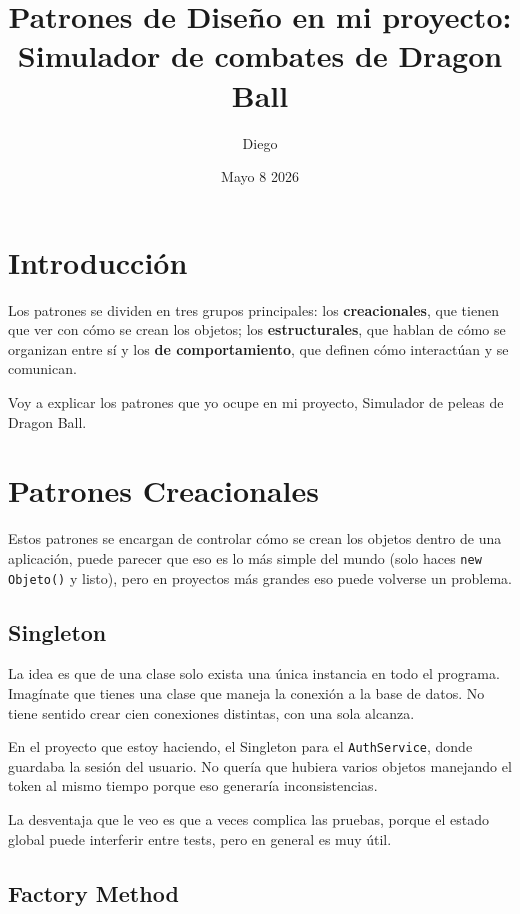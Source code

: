 \documentclass{article}
\title{Patrones de Dise\~no en mi proyecto: Simulador de combates de Dragon Ball}
\author{Diego}
\date{Mayo 8 2026}
\begin{document}
\maketitle

\tableofcontents
\newpage

\section{Introducci\'on}



Los patrones se dividen en tres grupos principales: los \textbf{creacionales},
que tienen que ver con c\'omo se crean los objetos; los \textbf{estructurales},
que hablan de c\'omo se organizan entre s\'i y los \textbf{de comportamiento},
que definen c\'omo interact\'uan y se comunican.

Voy a explicar los patrones que yo ocupe en mi proyecto, Simulador de peleas de Dragon Ball.

\section{Patrones Creacionales}

Estos patrones se encargan de controlar c\'omo se crean los objetos dentro de
una aplicaci\'on, puede parecer que eso es lo m\'as simple del
mundo (solo haces \texttt{new Objeto()} y listo), pero en proyectos m\'as
grandes eso puede volverse un problema.

\subsection{Singleton}
La idea es que de una clase solo exista una \'unica instancia en todo el programa. Imag\'inate que tienes una
clase que maneja la conexi\'on a la base de datos. No tiene sentido crear
cien conexiones distintas, con una sola alcanza.

En el proyecto que estoy haciendo, el Singleton para el
\texttt{AuthService}, donde guardaba la sesi\'on del usuario. No quer\'ia
que hubiera varios objetos manejando el token al mismo tiempo porque eso
generar\'ia inconsistencias.

La desventaja que le veo es que a veces complica las pruebas, porque el
estado global puede interferir entre tests, pero en general es muy \'util.

\subsection{Factory Method}
\end{document}
